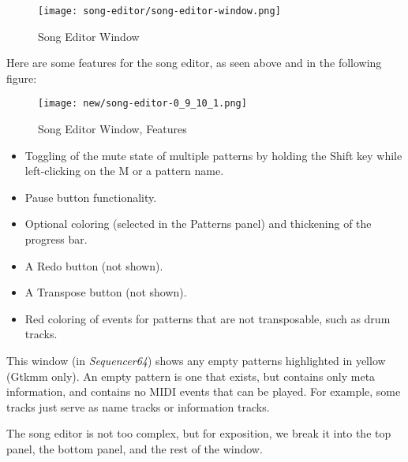\begin{figure}[H]
   \centering 
   \texttt{[image: song-editor/song-editor-window.png]}
   \caption{Song Editor Window}
   \label{fig:song_editor_window}
\end{figure}

   Here are some features for the song editor, as
   seen above and in the following figure:

\begin{figure}[H]
   \centering 
   \texttt{[image: new/song-editor-0\_9\_10\_1.png]}
   \caption{Song Editor Window, Features}
   \label{fig:song_editor_window_new_features}
\end{figure}

   \begin{itemize}
      \item Toggling of the mute state of multiple patterns by holding the
         Shift key while left-clicking on the M or a pattern name.
      \item Pause button functionality.
      \item Optional coloring (selected in the Patterns panel)
         and thickening of the progress bar.
      \item A Redo button (not shown).
      \item A Transpose button (not shown).
      \item Red coloring of events for patterns that are not transposable, such
         as drum tracks.
   \end{itemize}

   This window (in \textsl{Sequencer64}) shows any empty patterns
   highlighted in yellow (Gtkmm only).
   An empty pattern is one that exists, but
   contains only meta information, and contains no MIDI events that
   can be played.  For example, some tracks just serve as name tracks or
   information tracks.
   
   The song editor is not too complex, but for exposition, we break it into
   the top panel, the bottom panel, and the rest of the window.

%

